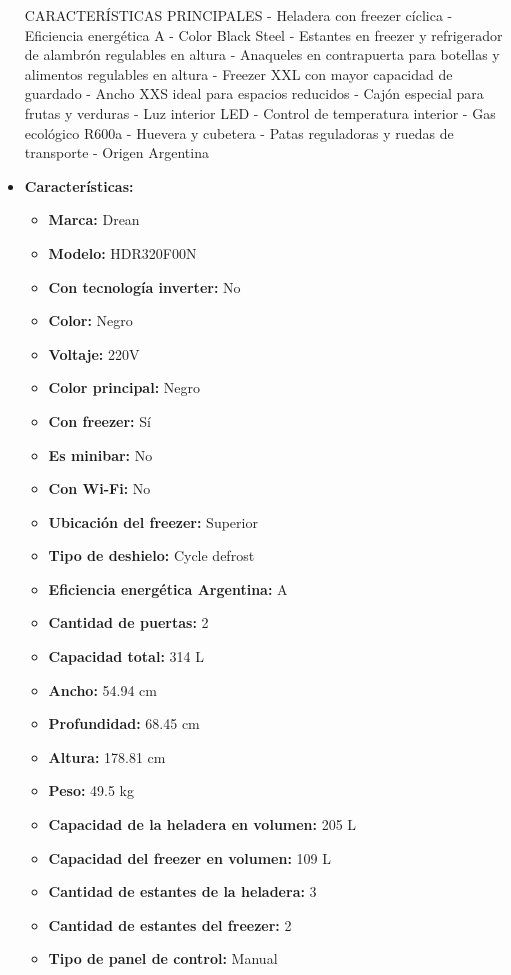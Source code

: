 \documentclass{article}
\begin{document}
\begin{adjustwidth}{2em}{}
\begin{itemize}
CARACTERÍSTICAS PRINCIPALES
- Heladera con freezer cíclica
- Eficiencia energética A
- Color Black Steel
- Estantes en freezer y refrigerador de alambrón regulables en altura
- Anaqueles en contrapuerta para botellas y alimentos regulables en altura
- Freezer XXL con mayor capacidad de guardado
- Ancho XXS ideal para espacios reducidos
- Cajón especial para frutas y verduras
- Luz interior LED
- Control de temperatura interior
- Gas ecológico R600a
- Huevera y cubetera
- Patas reguladoras y ruedas de transporte
- Origen Argentina
    \item \textbf{Características:} 
    \begin{itemize}
        \item \textbf {Marca:} Drean
    \item \textbf {Modelo:} HDR320F00N
    \item \textbf {Con tecnología inverter:} No
    \item \textbf {Color:} Negro
    \item \textbf {Voltaje:} 220V
    \item \textbf {Color principal:} Negro
    \item \textbf {Con freezer:} Sí
    \item \textbf {Es minibar:} No
    \item \textbf {Con Wi-Fi:} No
    \item \textbf {Ubicación del freezer:} Superior
    \item \textbf {Tipo de deshielo:} Cycle defrost
    \item \textbf {Eficiencia energética Argentina:} A
    \item \textbf {Cantidad de puertas:} 2
    \item \textbf {Capacidad total:} 314 L
    \item \textbf {Ancho:} 54.94 cm
    \item \textbf {Profundidad:} 68.45 cm
    \item \textbf {Altura:} 178.81 cm
    \item \textbf {Peso:} 49.5 kg
    \item \textbf {Capacidad de la heladera en volumen:} 205 L
    \item \textbf {Capacidad del freezer en volumen:} 109 L
    \item \textbf {Cantidad de estantes de la heladera:} 3
    \item \textbf {Cantidad de estantes del freezer:} 2
    \item \textbf {Tipo de panel de control:} Manual

\end{itemize}
\end{itemize}
\end{adjustwidth}
\end{document}
